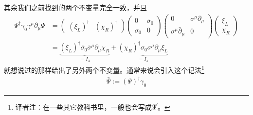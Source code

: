 其余我们之前找到的两个不变量完全一致，并且
\[\begin{split}
\Psi^\dagger\gamma_0\gamma^\mu\partial_\mu\Psi &= \left(\begin{matrix}(\xi_L)^\dagger&(\chi_R)^\dagger\end{matrix}\right)\left(\begin{matrix}0&\bar\sigma_0\\\sigma_0&0\end{matrix}\right)\left(\begin{matrix}0&\sigma^\mu\partial_\mu\\\sigma^\mu\bar\partial_\mu&0\end{matrix}\right)\left(\begin{matrix}\xi_L\\\chi_R\end{matrix}\right)\\
& =\underbrace{(\xi_L)^\dagger\bar\sigma_0\bar\sigma^\mu\partial_\mu\chi_R}_{=I_3}+\underbrace{(\chi_R)^\dagger\sigma_0\sigma^\mu\partial_\mu\xi_L}_{=I_4} 
\end{split}\]
就想说过的那样给出了另外两个不变量。通常来说会引入这个记法\footnote{译者注：在一些其它教科书里，一般也会写成$\cancel{\Psi}$。}
\begin{align}
\bar\Psi:=(\Psi)^\dagger\gamma_0
\end{align}

